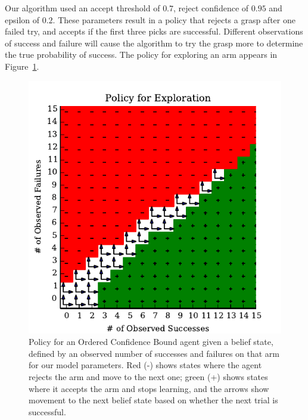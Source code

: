 \documentclass{article}
\newcommand{\algorithmCTxt}{Ordered Confidence Bound\xspace}
\begin{document}
Our algorithm used an accept threshold of $0.7$, reject confidence of
$0.95$ and epsilon of $0.2$.  These parameters result in a policy that
rejects a grasp after one failed try, and accepts if the first three
picks are successful.  Different observations of success and failure
will cause the algorithm to try the grasp more to determine the true
probability of success.  The policy for exploring an arm appears in
Figure~\ref{fig:policy}.

\begin{figure}
\includegraphics{figures/policy.pdf}
\caption{Policy for an \algorithmCTxt agent given a belief state, defined by an
  observed number of successes and failures on that arm for our model
  parameters.  Red (-) shows states where the agent rejects the arm
  and move to the next one; green (+) shows states where it accepts
  the arm and stops learning, and the arrows show movement to the next
  belief state based on whether the next trial is successful.\label{fig:policy}}
\end{figure}
\end{document}
